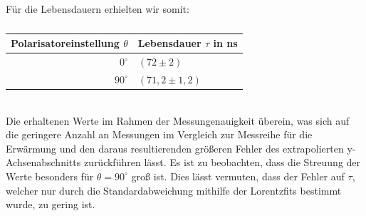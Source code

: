 ~\\
Für die Lebensdauern erhielten wir somit:
\begin{table}[htbp]
\begin{center}
\caption{}
\begin{tabular}{|r|l|}
\hline
\multicolumn{1}{|l|}{Polarisatoreinstellung $\theta$} & Lebensdauer $\tau$ in ns \\ \hline
$0^{\circ}$ & $(72\pm2)$ \\ \hline
$90^{\circ}$ & $(71,2\pm1,2)$ \\ \hline
\end{tabular}
\end{center}
\label{}
\end{table}
~\\
Die erhaltenen Werte im Rahmen der Messungenauigkeit überein, was sich auf die geringere Anzahl an Messungen im Vergleich zur Messreihe für die Erwärmung und den daraus resultierenden größeren Fehler des extrapolierten y-Achsenabschnitts zurückführen lässt. Es ist zu beobachten, dass die Streuung der Werte besonders für $\theta=90^{\circ}$ groß ist. Dies lässt vermuten, dass der Fehler auf $\tau$, welcher nur durch die Standardabweichung mithilfe der Lorentzfits bestimmt wurde, zu gering ist. 
